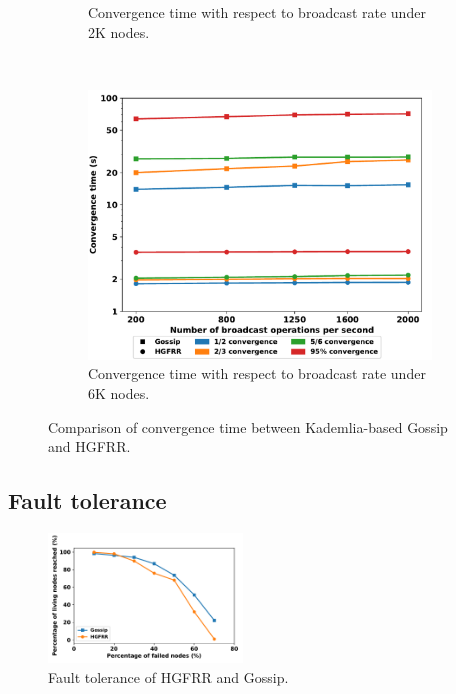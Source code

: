 \begin{figure}[t]
\begin{subfigure}[t]{0.3\textwidth}
    \caption{Convergence time with respect to broadcast rate under 2K nodes.}
    \label{hgfr_ourgossip_cvgtime_on_tps_2k}
    \end{subfigure}
    ~
    \begin{subfigure}[t]{0.3\textwidth}
	  \includegraphics[width=\textwidth]{figures/hgfr_ourgossip_cvgtime_on_tps_6k.pdf}
	  \caption{Convergence time with respect to broadcast rate under 6K nodes.}
    \label{hgfr_ourgossip_cvgtime_on_tps_6k}
    \end{subfigure}

	\caption{Comparison of convergence time between Kademlia-based Gossip and HGFRR.}
	\label{fig_eth_ourgossip_cvgtime}
	\vspace{-0.5cm}
\end{figure}

\subsection{Fault tolerance}
\begin{figure}[ht]
	\centering
	  \includegraphics[width=0.46\textwidth]{figures/hgfr_ourgossip_fault.pdf}

	  \caption{Fault tolerance of HGFRR and Gossip.}
	  \label{fig_hgfr_gossip_ft}
	  \vspace{-0.5cm}
  \end{figure}

